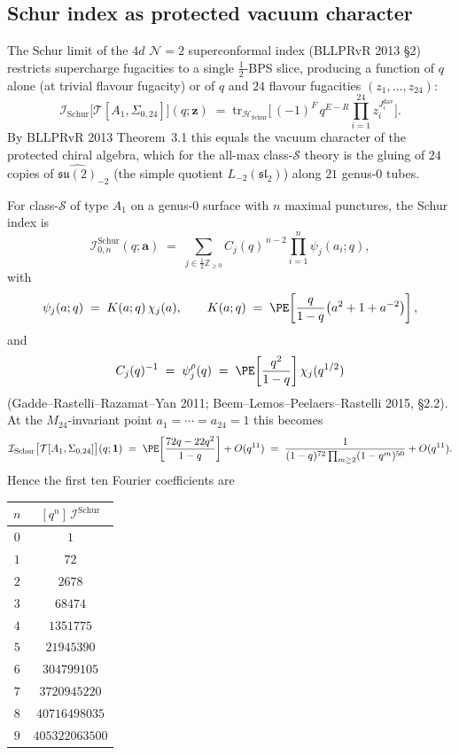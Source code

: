 \subsection{Schur index as protected vacuum character}
\label{subsec:k3-schur-index-qexp}

The Schur limit of the $4d$ $\mathcal{N}=2$ superconformal index (BLLPRvR
2013 \S2) restricts supercharge fugacities to a single $\tfrac{1}{2}$-BPS
slice, producing a function of $q$ alone (at trivial flavour fugacity) or of
$q$ and $24$ flavour fugacities $(z_1,\ldots,z_{24})$:
\[
 \mathcal{I}_{\mathrm{Schur}}\bigl[\mathcal{T}[A_1,\Sigma_{0,24}]\bigr](q;\mathbf{z})
 \;=\;
 \mathrm{tr}_{\mathcal{H}_{\mathrm{Schur}}}\!\bigl[\,(-1)^F\, q^{E - R}
 \prod_{i=1}^{24} z_i^{J_i^{\mathrm{flav}}}\bigr].
\]
By BLLPRvR 2013 Theorem~3.1 this equals the vacuum character of the protected
chiral algebra, which for the all-max class-$\mathcal{S}$ theory is the
gluing of $24$ copies of $\widehat{\mathfrak{su}(2)}_{-2}$ (the simple quotient
$L_{-2}(\mathfrak{sl}_2)$) along $21$ genus-$0$ tubes.

\begin{proposition}
\label{prop:k3-schur-q-expansion}
For class-$\mathcal{S}$ of type $A_1$ on a genus-$0$ surface with $n$
maximal punctures, the Schur index is
\[
 \mathcal{I}_{0,n}^{\mathrm{Schur}}(q;\mathbf{a})
 \;=\;
 \sum_{j\in \frac{1}{2}\mathbb{Z}_{\geq 0}}
 C_j(q)^{\,n-2}\prod_{i=1}^n \psi_j(a_i;q),
\]
with
\[
 \psi_j(a;q)
 \;=\;
 K(a;q)\,\chi_j(a),
 \qquad
 K(a;q)
 \;=\;
 \PE\!\left[\frac{q}{1-q}\bigl(a^2+1+a^{-2}\bigr)\right],
\]
and
\[
 C_j(q)^{-1}
 \;=\;
 \psi_j^\rho(q)
 \;=\;
 \PE\!\left[\frac{q^2}{1-q}\right]\chi_j(q^{1/2})
\]
(Gadde--Rastelli--Razamat--Yan 2011; Beem--Lemos--Peelaers--Rastelli 2015,
\S2.2). At the $M_{24}$-invariant point $a_1=\cdots=a_{24}=1$ this becomes
\[
 \mathcal{I}_{\mathrm{Schur}}\bigl[\mathcal{T}[A_1,\Sigma_{0,24}]\bigr](q;\mathbf{1})
 \;=\;
 \PE\!\left[\frac{72q-22q^2}{1-q}\right] + O(q^{11})
 \;=\;
 \frac{1}{(1-q)^{72}\prod_{m\geq 2}(1-q^m)^{50}} + O(q^{11}).
\]
Hence the first ten Fourier coefficients are
\begin{center}
\begin{tabular}{|c|c|}
\hline
$n$ & $[q^n]\,\mathcal{I}^{\mathrm{Schur}}$ \\
\hline
$0$ & $1$ \\
$1$ & $72$ \\
$2$ & $2678$ \\
$3$ & $68474$ \\
$4$ & $1351775$ \\
$5$ & $21945390$ \\
$6$ & $304799105$ \\
$7$ & $3720945220$ \\
$8$ & $40716498035$ \\
$9$ & $405322063500$ \\
\hline
\end{tabular}
\end{center}
\end{proposition}

